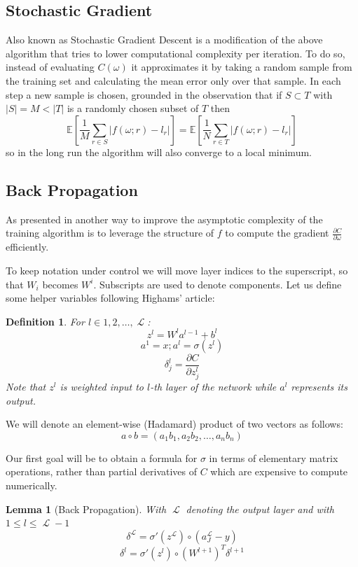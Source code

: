 \documentclass[a4paper,11pt]{article}
\theoremstyle{break}
\newtheorem{definition}{Definition}[section]
\newtheorem{lemma}[theorem]{Lemma}
\newcommand{\Exp}{\mathbb{E}}
\newcommand{\Part}[2]{\frac{\partial #1}{\partial #2}}
\DeclareMathOperator{\La}{\mathcal{L}}
\begin{document}
\subsection{Stochastic Gradient}
Also known as Stochastic Gradient Descent is a modification of the above algorithm that tries to lower computational complexity per iteration. To do so, instead of evaluating $C(\omega)$ it approximates it by taking a random sample from the training set and calculating the mean error only over that sample. In each step a new sample is chosen, grounded in the observation that if $ S \subset T $ with $ | S | = M < |T| $ is a randomly chosen subset of $T$ then
    $$ \Exp \left[ \frac{1}{M} \sum_{r \in S} | f(\omega; r) - l_r | \right] =
       \Exp \left[ \frac{1}{N} \sum_{r \in T} | f(\omega; r) - l_r | \right] $$
so in the long run the algorithm will also converge to a local minimum.


\subsection{Back Propagation}
As presented in \cite[pp11-14]{higham} another way to improve the asymptotic complexity of the training algorithm is to leverage the structure of $f$ to compute the gradient $ \frac{\partial C}{\partial \omega} $ efficiently.

To keep notation under control we will move layer indices to the superscript, so that $W_i$ becomes $ W^i $. Subscripts are used to denote components. Let us define some helper variables following Highams' article:
\begin{definition}\label{def:back_prop_helper}
For $ l \in {1, 2, \ldots, \La} $:
    $$ z^l = W^l a^{l-1} + b^{l} $$
    $$ a^1 = x; a^l = \sigma( z^l ) $$
    $$ \delta^l_j = \Part{C}{ z_j^l } $$
Note that $z^l$ is weighted input to $l$-th layer of the network while $a^l$ represents its output.
\end{definition}

We will denote an element-wise (Hadamard) product of two vectors as follows:
    \newcommand{\hadam}{\circ}
    $$ a \hadam b = (a_1 b_1, a_2 b_2, \ldots, a_n b_n)$$

Our first goal will be to obtain a formula for $\sigma$ in terms of elementary matrix operations, rather than partial derivatives of $C$ which are expensive to compute numerically.

\begin{lemma}[Back Propagation]\label{lem:back_propagation}
With $\La$ denoting the output layer and with $ 1 \leq l \leq \La - 1$ 
\begin{equation}\label{eq:last_sigma}
   \delta^{\La} = \sigma'(z^{\La}) \hadam (a_J^{\La} - y ) 
\end{equation}
\begin{equation}\label{eq:previous_sigma}
    \delta^l = \sigma'(z^l) \hadam (W^{l+1})^T \delta^{l+1}
\end{equation}
\end{lemma}
\end{document}
